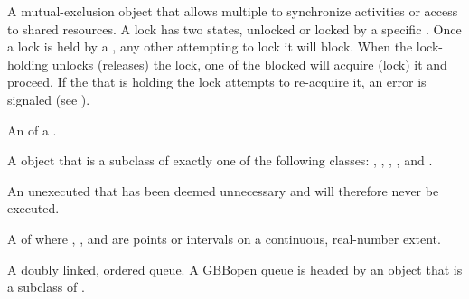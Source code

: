\documentclass[10pt,twoside,english,pdftex]{article}
\begin{document}
\begin{glossary-list}

\glent[lock] 
%
%
%
A mutual-exclusion object that allows multiple  to
synchronize activities or access to shared resources. A lock has two
states, unlocked or locked by a specific . Once a lock
is held by a , any other  attempting to
lock it will block. When the lock-holding  unlocks
(releases) the lock, one of the blocked  will acquire
(lock) it and proceed.  If the  that is holding the lock
attempts to re-acquire it, an error is signaled (see
).


\glent[metaobject]
An  of a .


%
%
A  object that is a subclass of exactly one of the following
classes: , , ,
, and .


%
%
%
%
%
%
%
An unexecuted  that has been deemed unnecessary and will
therefore never be executed.


%
%
%
%
A  of   where
, , and 
 are points or intervals on a continuous,
real-number extent.


%
%
%
A doubly linked, ordered queue.  A GBBopen queue is headed by an object that
is a subclass of \textbf{}.


\end{glossary-list}
\end{document}
